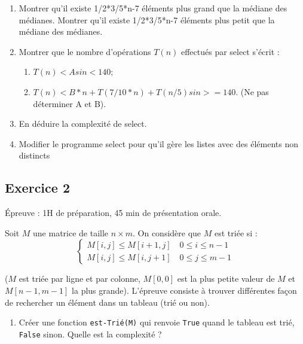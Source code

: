 \documentclass[10pt,fleqn]{article} %
\begin{document}
\begin{multicols}{2}
\begin{enumerate}
\begin{itemize}
\item on calcule la médiane de chaque petite liste. On obtient un tableau de médianes $M$;
\item on calcule la médiane des médianes : $mdm$,
\item on sépare la liste \texttt{lst} en 2 listes : une liste de valeurs plus grande que la médiane des médianes, une liste de valeurs plus petite que la médiane des médianes,
\item trouver la condition d’arrêt et d’appel récursif.
\end{itemize}
\item Montrer qu’il existe 1/2*3/5*n-7 éléments plus grand que la médiane des médianes. Montrer qu’il existe 1/2*3/5*n-7 éléments plus petit que la médiane des médianes.
\item Montrer que le nombre d’opérations $T(n)$ effectués par select s’écrit :
\begin{enumerate}
\item $T(n)<A si n<140$;
\item $T(n)<B*n+T(7/10*n)+T(n/5) si n>=140$. (Ne pas déterminer A et B).
\end{enumerate}
\item En déduire la complexité de select.
\item Modifier le programme select pour qu’il gère les listes avec des éléments non distincts
\end{enumerate}

\subsection*{Exercice 2}
Épreuve : 1H de préparation, 45 min de présentation orale.

Soit $M$ une matrice de taille $n\times m$. On considère que $M$ est triée si : 
$$
\left\{
\begin{array}{c}
M[i,j] \leq M[i+1,j] \quad 0\leq i \leq n-1  \\
M[i,j] \leq M[i,j+1] \quad 0\leq j \leq m-1 
\end{array}
\right.
$$

($M$ est triée par ligne et par colonne, $M[0,0]$ est la plus petite valeur de $M$ et $M[n-1,m-1]$ la plus grande). 
L'épreuve consiste à trouver différentes façon de rechercher un élément dans un tableau (trié ou non).


\begin{enumerate}
\item Créer une fonction \texttt{est-Trié(M)} qui renvoie \texttt{True} quand le tableau est trié, \texttt{False} sinon. Quelle est la complexité ?


\end{enumerate}
\end{multicols}
\end{document}
